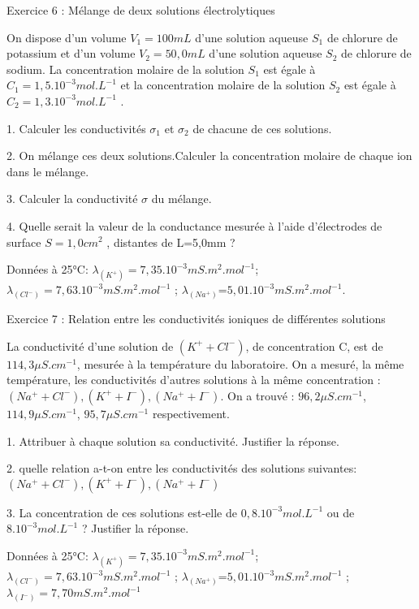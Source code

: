 \documentclass[12pt, french]{article}
\begin{document}

\begin{Box2}{Exercice 6 : Mélange de deux solutions électrolytiques }

   On dispose d’un volume $V_1=100mL$ d’une solution aqueuse $S_1$ de chlorure de potassium et d’un
volume $V_2=50,0mL$ d’une solution aqueuse $S_2$ de chlorure de sodium. La concentration molaire de la
   solution $S_1$ est égale à $C_1=1,5.10^{-3}mol.L^{-1}$ et la concentration molaire de la solution $S_2$ est égale à $C_2=1,3.10^{-3}mol.L^{-1}$ .

   1. Calculer les conductivités $\sigma_1$ et $\sigma_2$ de chacune de ces solutions.

2. On mélange ces deux solutions.Calculer la concentration molaire de chaque ion dans le mélange.

3. Calculer la conductivité $\sigma$ du mélange.

4. Quelle serait la valeur de la conductance mesurée à l’aide d’électrodes de surface $S=1,0cm^2$ , distantes de L=5,0mm ?

Données  à 25°C: $\lambda_{(K^+)}=7,35.10^{-3} mS.m^2.mol^{-1}$; $\lambda_{(Cl^-)}=7,63.10^{-3} mS.m^2.mol^{-1}$ ; $\lambda_{(Na^+)}$=$5,01. 10^{-3}mS.m^2.mol^{-1}.$



\end{Box2}



\begin{Box2}{Exercice 7 : Relation entre les conductivités ioniques de différentes solutions }

   La conductivité d’une solution de $(K^+ + Cl^-)$, de concentration C, est de $114,3\mu S.cm^{-1}$, mesurée à la température du laboratoire. On a mesuré, la même température, les conductivités d’autres solutions à la même concentration :  $(Na^+ + Cl^- ), (K^+ + I^- ), (Na^+ + I^- )$. On a trouvé : $96,2 \mu S.cm^{-1}$, $114,9 \mu S.cm^{-1}$, $95,7 \mu S.cm^{-1}$ respectivement.

1. Attribuer à chaque solution sa conductivité. Justifier la réponse.

2. quelle relation a-t-on entre les conductivités des solutions suivantes:$(Na^+ + Cl^- ), (K^+ + I^- ), (Na^+ + I^- )$

   3. La concentration de ces solutions est-elle de $0,8.10^{-3} mol.L^{-1}$ ou de $8.10^{-3} mol.L^{-1}$ ? Justifier la réponse.


   Données  à 25°C: $\lambda_{(K^+)}=7,35.10^{-3} mS.m^2.mol^{-1}$; $\lambda_{(Cl^-)}=7,63.10^{-3} mS.m^2.mol^{-1}$ ; $\lambda_{(Na^+)}$=$5,01. 10^{-3}mS.m^2.mol^{-1}$ ; $\lambda_{(I^-)} = 7,70 mS.m^2.mol^{-1}$


\end{Box2}

\end{document}
